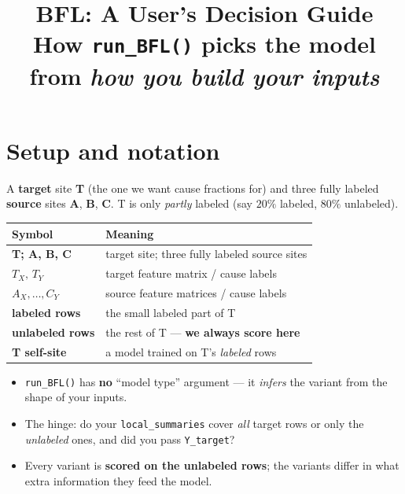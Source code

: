 \documentclass[11pt]{article}
\title{\vspace{-1.2em}\textbf{BFL: A User's Decision Guide}\\[2pt]
\large How \texttt{run\_BFL()} picks the model from \emph{how you build your inputs}}
\author{}\date{}
\begin{document}
\maketitle
\vspace{-3em}

\section{Setup and notation}
A \textbf{target} site \textbf{T} (the one we want cause fractions for) and three
fully labeled \textbf{source} sites \textbf{A}, \textbf{B}, \textbf{C}. T is only
\emph{partly} labeled (say $20\%$ labeled, $80\%$ unlabeled).

\begin{center}
\renewcommand{\arraystretch}{1.2}
\begin{tabularx}{\textwidth}{@{}>{\bfseries}l Y@{}}
\toprule
Symbol & Meaning\\
\midrule
T; A, B, C        & target site; three fully labeled source sites\\
$T_X,\,T_Y$       & target feature matrix / cause labels\\
$A_X,\dots,C_Y$   & source feature matrices / cause labels\\
labeled rows      & the small labeled part of T\\
unlabeled rows    & the rest of T --- \textbf{we always score here}\\
T self-site       & a model trained on T's \emph{labeled} rows\\
\bottomrule
\end{tabularx}
\end{center}

\begin{itemize}
  \item \texttt{run\_BFL()} has \textbf{no} ``model type'' argument --- it
        \emph{infers} the variant from the shape of your inputs.
  \item The hinge: do your \texttt{local\_summaries} cover \emph{all} target
        rows or only the \emph{unlabeled} ones, and did you pass \texttt{Y\_target}?
  \item Every variant is \textbf{scored on the unlabeled rows}; the variants
        differ in what extra information they feed the model.
\end{itemize}

\end{document}
